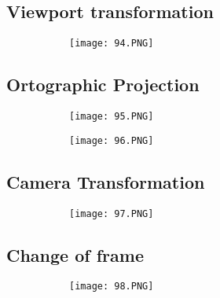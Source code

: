 \documentclass{article}
\begin{document}
\subsection{Viewport transformation}

\begin{figure}[ht!]
  \centering
  \begin{subfigure}[b]{0.4\linewidth}
    \texttt{[image: 94.PNG]}
  \end{subfigure}
\end{figure}

\subsection{Ortographic Projection}

\begin{figure}[ht!]
  \centering
  \begin{subfigure}[b]{0.49\linewidth}
    \texttt{[image: 95.PNG]}
  \end{subfigure}
  \begin{subfigure}[b]{0.5\textwidth}
         \centering
         \texttt{[image: 96.PNG]}
     \end{subfigure}
\end{figure}



\subsection{Camera Transformation}

\vspace{50mm}

\begin{figure}[ht!]
  \centering
  \begin{subfigure}[b]{0.6\linewidth}
    \texttt{[image: 97.PNG]}
  \end{subfigure}
\end{figure}


\subsection{Change of frame}

\begin{figure}[ht!]
  \centering
  \begin{subfigure}[b]{0.5\linewidth}
    \texttt{[image: 98.PNG]}
  \end{subfigure}
\end{figure}
\end{document}
